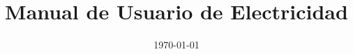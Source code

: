 ﻿\documentclass[12pt,a4paper]{article}
\title{Manual de Usuario de Electricidad}
\author{}
\date{\today}
\begin{document}
\maketitle
\manualnotalinks
\manualnavegacion
\tableofcontents
\newpage



\bigskip
\manualnavegacion
\end{document}
